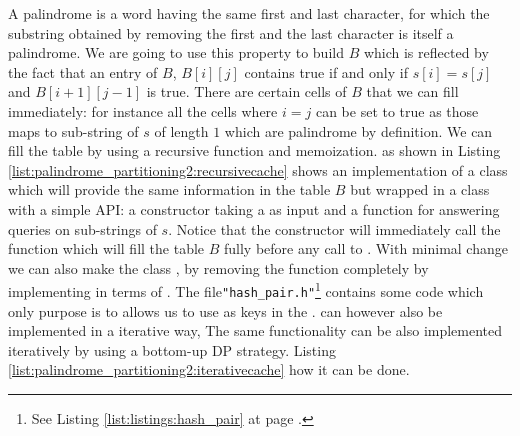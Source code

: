 A palindrome is a word having the same first and last character, for which the substring obtained by
removing the first and the last character is itself a palindrome. We are going to use this property
to build $B$ which is reflected by the fact that an entry of $B$,
$B[i][j]$ contains true if and only if $s[i]=s[j]$ and $B[i+1][j-1]$ is true.
There are certain cells of $B$ that we can fill immediately: for instance all the cells where $i=j$
can be set to true as those maps to sub-string of $s$ of length $1$ which are palindrome by
definition. We can fill the table by using a  recursive function and memoization. as shown in 
Listing \ref{list:palindrome_partitioning2:recursivecache} shows an implementation of a class which will provide the same information in the table $B$
but wrapped in a class with a simple API: a constructor taking a  as input and a function 
for answering queries on sub-strings of $s$.
Notice that the constructor will immediately call the function  which will fill the table $B$ fully before any call to . 
With minimal change we can also make the class , by removing the  function completely by implementing 
in terms of .
The file\texttt{"hash\_pair.h"}\footnote{See Listing \ref{list:listings:hash_pair} at page \pageref{list:listings:hash_pair}.} contains some code which only purpose is to 
allows us to use  as keys in the .
can however also be implemented in a iterative way, 
The same functionality can be also implemented iteratively
by using a bottom-up DP strategy. 
Listing \ref{list:palindrome_partitioning2:iterativecache} how it can be done.





